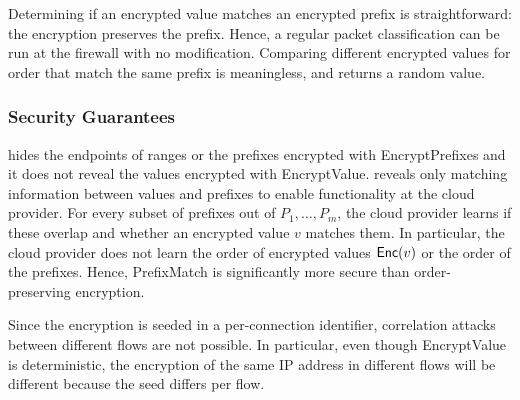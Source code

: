 \begin{framed}
\end{framed}



Determining if an encrypted value matches an encrypted prefix is straightforward: the encryption preserves the prefix.
Hence, a regular packet classification can be run at the firewall with no modification. Comparing different encrypted values for order that match the same prefix is meaningless, and returns a random value.



\subsubsection{Security Guarantees}
\label{sec:buildingblocks:guarantees}

\pmatch{} hides the endpoints of ranges or the prefixes encrypted with EncryptPrefixes and it does not reveal the values encrypted with EncryptValue. \pmatch{} reveals only matching information between values and prefixes to enable functionality at the cloud provider.  For every subset of prefixes out of $P_1, \dots, P_m$, the cloud provider learns if these overlap and whether an encrypted value $v$ matches them. In particular, the cloud provider does not learn the order of encrypted values $\mathsf{Enc}(v)$ or the order of the prefixes. Hence, PrefixMatch is significantly more secure than order-preserving encryption.

%
Since the encryption is seeded in a per-connection identifier, correlation attacks between different flows are not possible. 
In particular, even though EncryptValue is deterministic, the encryption of the same IP address in different flows will be different because the seed differs per flow.

